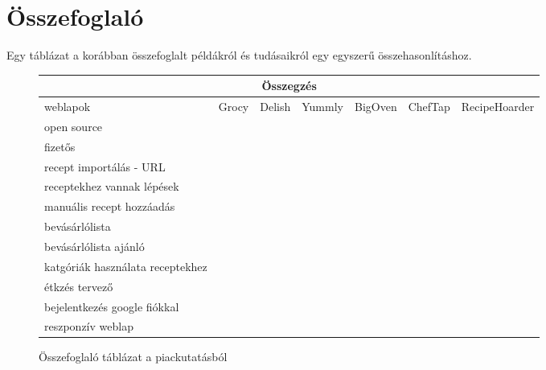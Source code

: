 \documentclass[12pt]{report}
\theoremstyle{definition}
\begin{document}
\section{Összefoglaló}
Egy táblázat a korábban összefoglalt példákról és tudásaikról egy egyszerű összehasonlításhoz.

\newcommand{\cmark}{\ding{51}}%
\newcommand{\xmark}{\ding{55}}%

\noindent
\begin{figure}[H]
	\centering

	\begin{tabular}{p{3cm} | c c c c c | c | @{}}
		\multicolumn{7}{c}{Összegzés}                                                                   \\ \midrule
		weblapok                         & Grocy  & Delish & Yummly & BigOven & ChefTap & RecipeHoarder \\ \cmidrule[2pt](r){2-7}
		open source                      & \cmark & \xmark & \xmark & \xmark  & \xmark  & \xmark \footnotemark\\\cmidrule(r){2-7}
		fizetős                          & \xmark & \xmark & \xmark & \cmark  & \cmark  & \xmark \footnotemark\\\cmidrule(r){2-7}
		recept importálás - URL          & \xmark & \xmark & \xmark & \cmark  & \cmark  & \cmark        \\ \cmidrule(r){2-7}
		receptekhez vannak lépések       & \xmark & \cmark & \cmark & \xmark  & \cmark  & \cmark        \\ \cmidrule(r){2-7}
		manuális recept hozzáadás        & \cmark & \xmark & \xmark & \cmark  & \cmark  & \cmark        \\ \cmidrule(r){2-7}
		bevásárlólista                   & \cmark & \xmark & \cmark & \cmark  & \cmark  & \cmark        \\ \cmidrule(r){2-7}
		bevásárlólista ajánló            & \cmark & \xmark & \xmark & \xmark  & \xmark  & \cmark        \\ \cmidrule(r){2-7}
		katgóriák használata receptekhez & \xmark & \cmark & \cmark & \xmark  & \cmark  & \cmark        \\ \cmidrule(r){2-7}
		étkzés tervező                   & \cmark & \xmark & \cmark & \xmark  & \xmark  & \xmark        \\ \cmidrule(r){2-7}
		bejelentkezés google fiókkal     & \xmark & \cmark & \cmark & \cmark  & \xmark  & \cmark        \\ \cmidrule(r){2-7}
		reszponzív weblap                & \cmark & \xmark & \xmark & \xmark  & \xmark  & \cmark        \\ \bottomrule
	\end{tabular}

	\caption{Összefoglaló táblázat a piackutatásból}
    \label{fig:table}
\end{figure}
\end{document}
